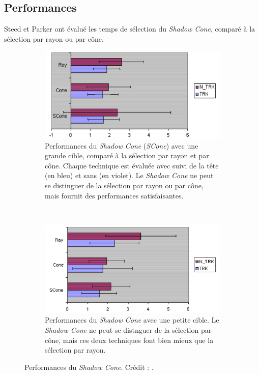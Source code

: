 	\subsection{Performances}
	Steed et Parker ont évalué les temps de sélection du \emph{Shadow Cone}, comparé à la sélection par rayon ou par cône.

	\begin{figure}[!htb]
		\begin{subfigure}[t]{0.49\textwidth}
			\centering
			\includegraphics[width=\textwidth]{figures/ch2/shadowSLarge}
			\caption{Performances du \emph{Shadow Cone} (\emph{SCone}) avec une grande cible, comparé à la sélection par rayon et par cône. Chaque technique est évaluée avec suivi de la tête (en bleu) et sans (en violet). Le \emph{Shadow Cone} ne peut se distinguer de la sélection par rayon ou par cône, mais fournit des performances satisfaisantes.}
			\label{fig:shadowSLarge}
		\end{subfigure}
		~
		\begin{subfigure}[t]{0.49\textwidth}
			\centering
			\includegraphics[width=\textwidth]{figures/ch2/shadowSSmall}
			\caption{Performances du \emph{Shadow Cone} avec une petite cible. Le \emph{Shadow Cone} ne peut se distnguer de la sélection par cône, mais ces deux techniques font bien mieux que la sélection par rayon.}
			\label{fig:shadowSSmall}
		\end{subfigure}
		\caption[Performances du \emph{Shadow Cone}]{Performances du \emph{Shadow Cone}. Crédit : \cite{steed20043d}.}
		\label{fig:shadowConePerf}
	\end{figure}
	
